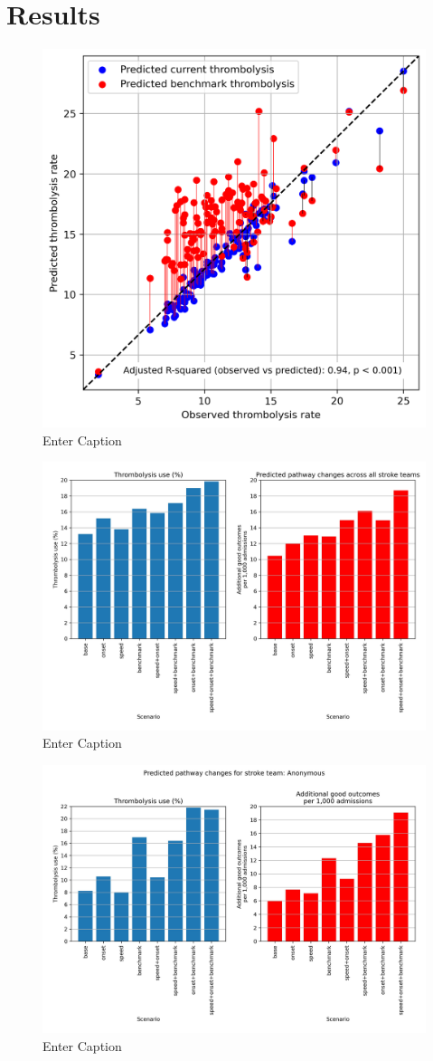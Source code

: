 \section{Results}

\begin{figure}
    \centering
    \includegraphics[width=0.65\linewidth]{images/thrombolysis_rates_model}
    \caption{Enter Caption}
    \label{fig:model_validation}
\end{figure}


\begin{figure}
    \centering
    \includegraphics[width=0.75\linewidth]{images/sim_results_summary}
    \caption{Enter Caption}
    \label{fig:sim_results_summary}
\end{figure}

\begin{figure}
    \centering
    \includegraphics[width=0.75\linewidth]{images/sim_results_team_x}
    \caption{Enter Caption}
    \label{fig:sim_results_team_x}
\end{figure}

